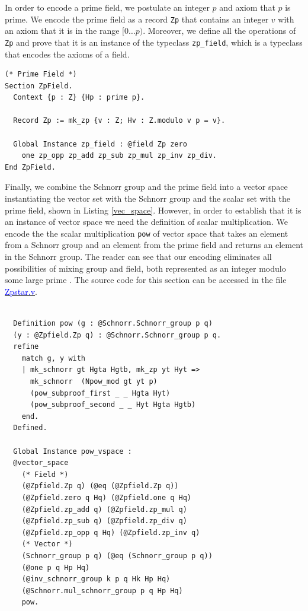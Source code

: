 \documentclass[sigconf, anonymous]{acmart}
\begin{document}
In order to encode a prime field, we postulate an integer $p$ and 
axiom that $p$ is prime. We encode the prime field as 
a record \texttt{Zp} that contains an integer $v$ with an axiom 
that it is in the range $[0 \ldots p)$. Moreover, 
we define all the operations of \texttt{Zp} and prove that 
it is an instance of the typeclass \texttt{zp\_field}, which is 
a typeclass that encodes the axioms of a field.

\begin{lstlisting}[frame=single, language=Coq, caption={Rocq Encoding of Prime Field},
  label={field_def},captionpos=t, basicstyle=\ttfamily\footnotesize,
  abovecaptionskip=-\medskipamount]
(* Prime Field *)
Section ZpField.
  Context {p : Z} {Hp : prime p}.

  Record Zp := mk_zp {v : Z; Hv : Z.modulo v p = v}.

  Global Instance zp_field : @field Zp zero 
    one zp_opp zp_add zp_sub zp_mul zp_inv zp_div.
End ZpField. 
\end{lstlisting}

Finally, we combine the Schnorr group and the prime field 
into a vector space instantiating the vector set with 
the Schnorr group and the scalar set with the prime field, 
shown in Listing \ref{vec_space}. 
However, in order to establish that it is an 
instance of vector space we need the definition 
of scalar multiplication. We encode the  
the scalar multiplication \texttt{pow} of 
vector space that takes an element from 
a Schnorr group and an element from 
the prime field and returns an element in the 
Schnorr group.  The reader can see that our encoding eliminates all 
possibilities of mixing group and field, both represented 
as an integer modulo some large prime \cite{10.1007/978-3-662-63958-0_24}.
The source code for this section can be accessed in the file \href{https://anonymous.4open.science/r/SigmaProtocol-EBA5/src/Utility/Zpstar.v}{\textcolor{blue}{Zpstar.v}}.

\begin{lstlisting}[frame=single, language=Coq, caption={Vector Space Instantiation},
  label={vec_space},captionpos=t, basicstyle=\ttfamily\footnotesize,
  abovecaptionskip=-\medskipamount]

  Definition pow (g : @Schnorr.Schnorr_group p q) 
  (y : @Zpfield.Zp q) : @Schnorr.Schnorr_group p q.
  refine 
    match g, y with 
    | mk_schnorr gt Hgta Hgtb, mk_zp yt Hyt => 
      mk_schnorr  (Npow_mod gt yt p) 
      (pow_subproof_first _ _ Hgta Hyt)
      (pow_subproof_second _ _ Hyt Hgta Hgtb)
    end.
  Defined.

  Global Instance pow_vspace : 
  @vector_space 
    (* Field *)
    (@Zpfield.Zp q) (@eq (@Zpfield.Zp q))
    (@Zpfield.zero q Hq) (@Zpfield.one q Hq)
    (@Zpfield.zp_add q) (@Zpfield.zp_mul q)
    (@Zpfield.zp_sub q) (@Zpfield.zp_div q)
    (@Zpfield.zp_opp q Hq) (@Zpfield.zp_inv q)
    (* Vector *)
    (Schnorr_group p q) (@eq (Schnorr_group p q))
    (@one p q Hp Hq) 
    (@inv_schnorr_group k p q Hk Hp Hq)
    (@Schnorr.mul_schnorr_group p q Hp Hq)
    pow.
  
\end{lstlisting}
\end{document}
